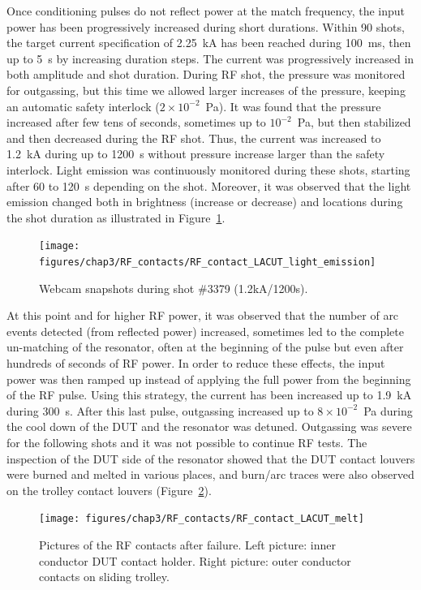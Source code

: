 {Once conditioning pulses do not reflect power at the match frequency, the input power has been progressively increased during short durations. Within 90 shots, the target current specification of 2.25~kA has been reached during 100~ms, then up to 5~s by increasing duration steps. The current was progressively increased in both amplitude and shot duration. During RF shot, the pressure was monitored for outgassing, but this time we allowed larger increases of the pressure, keeping an automatic safety interlock ($2\times10^{-2}$~Pa). It was found that the pressure increased after few tens of seconds, sometimes up to $10^{-2}$~Pa, but then stabilized and then decreased during the RF shot. Thus, the current was increased to 1.2~kA during up to 1200~s without pressure increase larger than the safety interlock. Light emission was continuously monitored during these shots, starting after 60 to 120~s depending on the shot. Moreover, it was observed that the light emission changed both in brightness (increase or decrease) and locations during the shot duration as illustrated in Figure~\ref{fig:rfcontactlacutlightemission}.

\begin{figure}[h]
	\centering
	\texttt{[image: figures/chap3/RF\_contacts/RF\_contact\_LACUT\_light\_emission]}
	\caption{Webcam snapshots during shot \#3379 (1.2kA/1200s).}
	\label{fig:rfcontactlacutlightemission}
\end{figure}

At this point and for higher RF power, it was observed that the number of arc events detected (from reflected power) increased, sometimes led to the complete un-matching of the resonator, often at the beginning of the pulse but even after hundreds of seconds of RF power. In order to reduce these effects, the input power was then ramped up instead of applying the full power from the beginning of the RF pulse. Using this strategy, the current has been increased up to 1.9~kA during 300~s. After this last pulse, outgassing increased up to $8\times 10^{-2}$~Pa during the cool down of the DUT and the resonator was detuned. Outgassing was severe for the following shots and it was not possible to continue RF tests. The inspection of the DUT side of the resonator showed that the DUT contact louvers were burned and melted in various places, and burn/arc traces were also observed on the trolley contact louvers (Figure~\ref{fig:rfcontactlacutmelt}). 


\begin{figure}[h]
	\centering
	\texttt{[image: figures/chap3/RF\_contacts/RF\_contact\_LACUT\_melt]}
	\caption{Pictures of the RF contacts after failure. Left picture: inner conductor DUT contact holder. Right picture: outer conductor contacts on sliding trolley.}
	\label{fig:rfcontactlacutmelt}
\end{figure}

}
